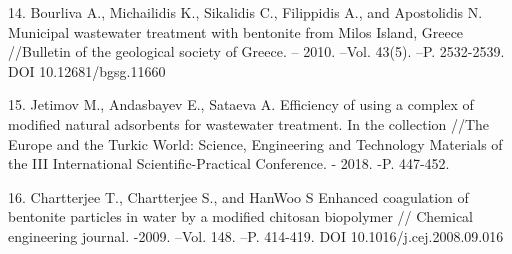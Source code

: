 \begin{references}
14. Bourliva A., Michailidis K., Sikalidis C., Filippidis A., and
Apostolidis N. Municipal wastewater treatment with bentonite from Milos
Island, Greece //Bulletin of the geological society of Greece. -- 2010.
--Vol. 43(5). --P. 2532-2539. DOI 10.12681/bgsg.11660

15. Jetimov M., Andasbayev E., Sataeva A. Efficiency of using a complex
of modified natural adsorbents for wastewater treatment. In the
collection //The Europe and the Turkic World: Science, Engineering and
Technology Materials of the III International Scientific-Practical
Conference. - 2018. -P. 447-452.

16. Chartterjee T., Chartterjee S., and HanWoo S Enhanced coagulation of
bentonite particles in water by a modified chitosan biopolymer //
Chemical engineering journal. -2009. --Vol. 148. --P. 414-419. DOI
10.1016/j.cej.2008.09.016
\end{references}

